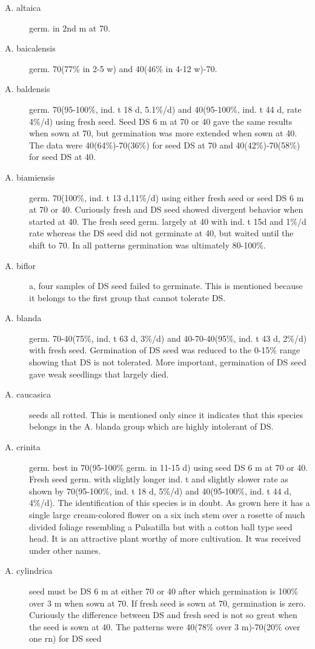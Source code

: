 \begin{description}
\item[A. altaica] germ. in 2nd m at 70.
\item[A. baicalensis] germ. 70(77\% in 2-5 w) and 40(46\% in 4-12 w)-70.
\item[A. baldensis] germ. 70(95-100\%, ind. t 18 d, 5.1\%/d) and 40(95-100\%, ind. t 44
d, rate 4\%/d) using fresh seed. Seed DS 6 m at 70 or 40 gave the same results
when sown at 70, but germination was more extended when sown at 40. The data
were 40(64\%)-70(36\%) for seed DS at 70 and 40(42\%)-70(58\%) for seed DS at 40.
\item[A. biamiensis] germ. 70(100\%, ind. t 13 d,11\%/d) using either fresh seed or seed
DS 6 m at 70 or 40. Curiously fresh and DS seed showed divergent behavior when
started at 40. The fresh seed germ. largely at 40 with ind. t 15d and 1\%/d rate
whereas the DS seed did not germinate at 40, but waited until the shift to 70. In all
patterns germination was ultimately 80-100\%.
\item[A. biflor]a, four samples of DS seed failed to germinate. This is mentioned
because it belongs to the first group that cannot tolerate DS.
\item[A. blanda] germ. 70-40(75\%, ind. t 63 d, 3\%/d) and 40-70-40(95\%, ind. t 43 d,
2\%/d) with fresh seed. Germination of DS seed was reduced to the 0-15\% range
showing that DS is not tolerated. More important, germination of DS seed gave weak
seedlings that largely died.
\item[A. caucasica] seeds all rotted. This is mentioned only since it indicates that this
species belongs in the A. blanda group which are highly intolerant of DS.
\item[A. crinita] germ. best in 70(95-100\% germ. in 11-15 d) using seed DS 6 m at 70
or 40. Fresh seed germ. with slightly longer ind. t and slightly slower rate as shown by
70(95-100\%, ind. t 18 d, 5\%/d) and 40(95-100\%, ind. t 44 d, 4\%/d). The identification
of this species is in doubt. As grown here it has a single large cream-colored flower on
a six inch stem over a rosette of much divided foliage resembling a Pulsatilla but with a
cotton ball type seed head. It is an attractive plant worthy of more cultivation. It was
received under other names.
\item[A. cylindrica] seed must be DS 6 m at either 70 or 40 after which germination is
100\% over 3 m when sown at 70. If fresh seed is sown at 70, germination is zero.
Curiously the difference between DS and fresh seed is not so great when the seed is
sown at 40. The patterns were 40(78\% over 3 m)-70(20\% over one rn) for DS seed

\end{description}
